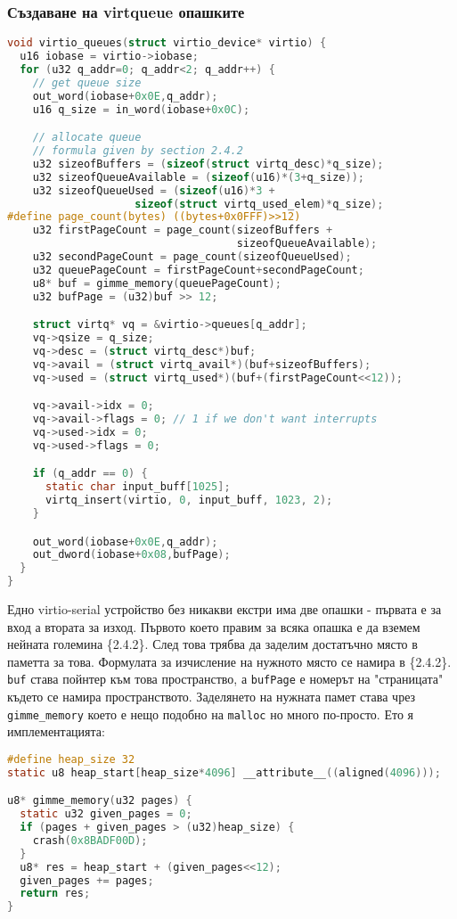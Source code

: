 \subsubsection{Създаване на virtqueue опашките}
\begin{lstlisting}[language=C]
void virtio_queues(struct virtio_device* virtio) {
  u16 iobase = virtio->iobase;
  for (u32 q_addr=0; q_addr<2; q_addr++) {
    // get queue size
    out_word(iobase+0x0E,q_addr);
    u16 q_size = in_word(iobase+0x0C);

    // allocate queue
    // formula given by section 2.4.2
    u32 sizeofBuffers = (sizeof(struct virtq_desc)*q_size);
    u32 sizeofQueueAvailable = (sizeof(u16)*(3+q_size));
    u32 sizeofQueueUsed = (sizeof(u16)*3 +
                    sizeof(struct virtq_used_elem)*q_size);
#define page_count(bytes) ((bytes+0x0FFF)>>12)
    u32 firstPageCount = page_count(sizeofBuffers +
                                    sizeofQueueAvailable);
    u32 secondPageCount = page_count(sizeofQueueUsed);
    u32 queuePageCount = firstPageCount+secondPageCount;
    u8* buf = gimme_memory(queuePageCount);
    u32 bufPage = (u32)buf >> 12;

    struct virtq* vq = &virtio->queues[q_addr];
    vq->qsize = q_size;
    vq->desc = (struct virtq_desc*)buf;
    vq->avail = (struct virtq_avail*)(buf+sizeofBuffers);
    vq->used = (struct virtq_used*)(buf+(firstPageCount<<12));

    vq->avail->idx = 0;
    vq->avail->flags = 0; // 1 if we don't want interrupts
    vq->used->idx = 0;
    vq->used->flags = 0;

    if (q_addr == 0) {
      static char input_buff[1025];
      virtq_insert(virtio, 0, input_buff, 1023, 2);
    }

    out_word(iobase+0x0E,q_addr);
    out_dword(iobase+0x08,bufPage);
  }
}
\end{lstlisting}
Едно virtio-serial устройство без никакви екстри има две опашки - първата е за вход а втората за изход. Първото което правим за всяка опашка е да вземем нейната големина \{2.4.2\}. След това трябва да заделим достатъчно място в паметта за това. Формулата за изчисление на нужното място се намира в \{2.4.2\}. {\tt buf} става пойнтер към това пространство, а {\tt bufPage} е номерът на "страницата" където се намира пространството. Заделянето на нужната памет става чрез {\tt gimme\_memory} което е нещо подобно на {\tt malloc} но много по-просто. Ето я имплементацията:
\begin{lstlisting}[language=C]
#define heap_size 32
static u8 heap_start[heap_size*4096] __attribute__((aligned(4096)));

u8* gimme_memory(u32 pages) {
  static u32 given_pages = 0;
  if (pages + given_pages > (u32)heap_size) {
    crash(0x8BADF00D);
  }
  u8* res = heap_start + (given_pages<<12);
  given_pages += pages;
  return res;
}
\end{lstlisting}

